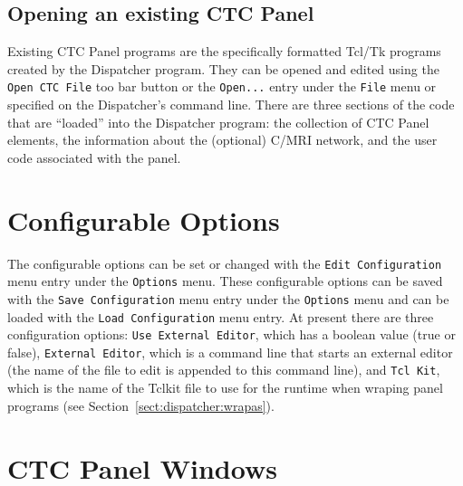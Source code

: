 \subsection{Opening an existing CTC Panel}

Existing CTC Panel programs are the specifically formatted Tcl/Tk programs
created by the Dispatcher program.  They can be opened and edited using
the \verb=Open CTC File= too bar button or the \verb=Open...= entry under
the \verb=File= menu or specified on the Dispatcher's command line. 
There are three sections of the code that are ``loaded'' into the
Dispatcher program: the collection of CTC Panel elements, the
information about the (optional) C/MRI network, and the user code
associated with the panel.

\section{Configurable Options}
\label{sect:dispatcher:configopts}

The configurable options can be set or changed with the 
\verb=Edit Configuration= menu entry under the \verb=Options= menu. These
configurable options can be saved with the \verb=Save Configuration=
menu entry under the \verb=Options= menu and can be loaded with the 
\verb=Load Configuration= menu entry.  At present there are three
configuration options: \verb=Use External Editor=, which has a boolean
value (true or false), \verb=External Editor=, which is a
command line that starts an external editor (the name of the file
to edit is appended to this command line), and \verb=Tcl Kit=, which is
the name of the Tclkit file to use for the runtime when wraping panel
programs (see Section~\ref{sect:dispatcher:wrapas}).

\section{CTC Panel Windows}

